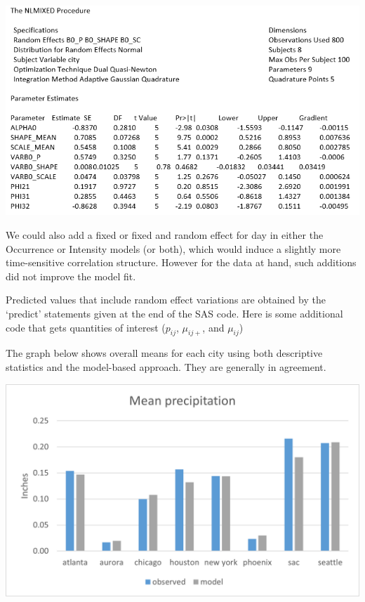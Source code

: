 \documentclass[
  9pt,
  ignorenonframetext,
]{beamer}
\begin{document}
\begin{frame}{}
\protect\hypertarget{section-8}{}
\begin{center}\includegraphics[width=1\linewidth]{figs_L18/f2} \end{center}
\end{frame}

\begin{frame}{}
\protect\hypertarget{section-9}{}
We could also add a fixed or fixed and random effect for day in either
the Occurrence or Intensity models (or both), which would induce a
slightly more time-sensitive correlation structure. However for the data
at hand, such additions did not improve the model fit.

Predicted values that include random effect variations are obtained by
the `predict' statements given at the end of the SAS code. Here is some
additional code that gets quantities of interest (\(p_{ij}\),
\(\mu_{ij+}\), and \(\mu_{ij}\))
\end{frame}

\begin{frame}{}
\protect\hypertarget{section-10}{}
The graph below shows overall means for each city using both descriptive
statistics and the model-based approach. They are generally in
agreement.

\begin{center}\includegraphics[width=0.5\linewidth]{figs_L18/f4} \end{center}
\end{frame}
\end{document}

